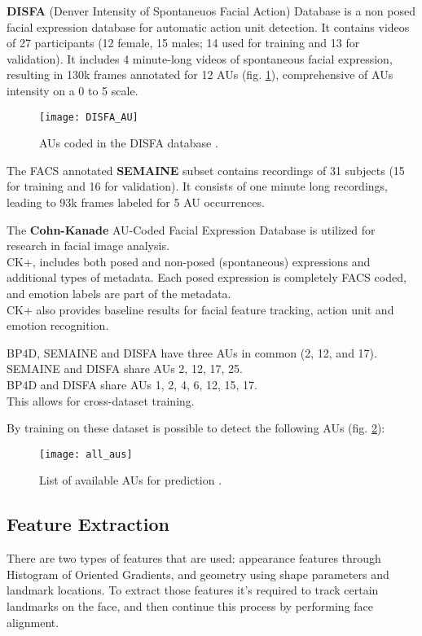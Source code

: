 \textbf{DISFA} (Denver Intensity of Spontaneuos Facial Action) Database is a non posed facial expression database for automatic action unit detection. It contains videos of 27 participants (12 female, 15 males; 14 used for training and 13 for validation). It includes 4 minute-long videos of spontaneous facial expression, resulting in 130k frames annotated for 12 AUs (fig. \ref{fig:DISFA_AU}), comprehensive of AUs intensity on a 0 to 5 scale.

\clearpage

\begin{figure}[H]
	\centering
	\texttt{[image: DISFA\_AU]}
	\caption{AUs coded in the DISFA database \cite{DISFA_AU}.}
	\label{fig:DISFA_AU}
\end{figure}

The FACS annotated \textbf{SEMAINE} subset contains recordings of 31 subjects (15 for training and 16 for validation). It consists of one minute long recordings, leading to 93k frames labeled for 5 AU occurrences.

The \textbf{Cohn-Kanade} AU-Coded Facial Expression Database is utilized for research in facial image analysis. \\
CK+, includes both posed and non-posed (spontaneous) expressions and additional types of metadata. Each posed expression is completely FACS coded, and emotion labels are part of the metadata. \\
CK+ also provides baseline results for facial feature tracking, action unit and emotion recognition.

BP4D, SEMAINE and DISFA have three AUs in common (2, 12, and 17). \\
SEMAINE and DISFA share AUs 2, 12, 17, 25. \\
BP4D and DISFA share AUs 1, 2, 4, 6, 12, 15, 17. \\
This allows for cross-dataset training.

\clearpage

By training on these dataset is possible to detect the following AUs (fig. \ref{fig:all_AUs}):

\begin{figure}[H]
	\centering
	\texttt{[image: all\_aus]}
	\caption{List of available AUs for prediction \cite{Baltru2018}.}
	\label{fig:all_AUs}
\end{figure}

\subsection{Feature Extraction} \label{featExtr}
There are two types of features that are used: appearance features through Histogram of Oriented Gradients, and geometry using shape parameters and landmark locations. To extract those features it's required to track certain landmarks on the face, and then continue this process by performing face alignment.

